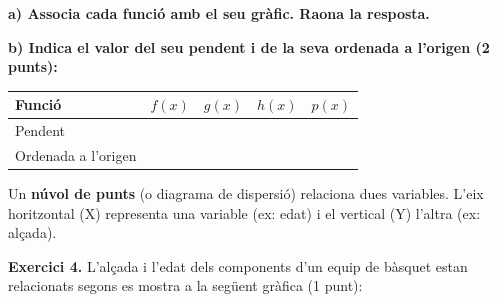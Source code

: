 \documentclass[12pt,a4paper]{article}
\begin{document}
\begin{center}
\end{center}
\textbf{a) Associa cada funció amb el seu gràfic. Raona la resposta.}
\vspace{1cm}

\textbf{b) Indica el valor del seu pendent i de la seva ordenada a l’origen (2 punts):}
\begin{center}
\renewcommand{\arraystretch}{2}
\begin{tabular}{|l|p{2cm}|p{2cm}|p{2cm}|p{2cm}|}
\hline
Funció & \centering $f(x)$ & \centering $g(x)$ & \centering $h(x)$ & \centering\arraybackslash $p(x)$ \\ \hline
Pendent & & & & \\ \hline
Ordenada a l'origen & & & & \\ \hline
\end{tabular}
\end{center}

\newpage
\begin{capsula}
Un \textbf{núvol de punts} (o diagrama de dispersió) relaciona dues variables. L'eix horitzontal (X) representa una variable (ex: edat) i el vertical (Y) l'altra (ex: alçada). 
\end{capsula}

\textbf{Exercici 4.} L’alçada i l’edat dels components d’un equip de bàsquet estan relacionats segons es mostra a la següent gràfica (1 punt):
\end{document}
